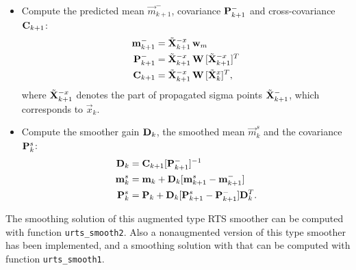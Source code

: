 \begin{itemize}
\item Compute the predicted mean $\vec{m}^-_{k+1}$, covariance
$\mathbf{P}^-_{k+1}$ and cross-covariance $\mathbf{C}_{k+1}$:
\begin{equation}
\begin{split} \mathbf{m}^-_{k+1} &= \tilde{\mathbf{X}}_{k+1}^{-x} \,
\mathbf{w}_m \\ \mathbf{P}^-_{k+1} &= \tilde{\mathbf{X}}_{k+1}^{-x} \, \mathbf{W}
\, [\tilde{\mathbf{X}}_{k+1}^{-x}]^T \\ \mathbf{C}_{k+1} &=
\tilde{\mathbf{X}}_{k+1}^{-x} \, \mathbf{W} \, [\tilde{\mathbf{X}}^x_{k}]^T,
\end{split}
\label{eq:urts4}
\end{equation}
%
where $\tilde{\mathbf{X}}_{k+1}^{-x}$ denotes the part of propagated
sigma points $\tilde{\mathbf{X}}_{k+1}^-$, which corresponds to
$\vec{x}_k$.
%
\item Compute the smoother gain $\mathbf{D}_k$, the smoothed mean
$\vec{m}_k^s$ and the covariance $\mathbf{P}_k^s$:
\begin{equation}
\begin{split} \mathbf{D}_k & = \mathbf{C}_{k+1} [\mathbf{P}_{k+1}^-]^{-1} \\
\mathbf{m}_k^s & = \mathbf{m}_k + \mathbf{D}_k [\mathbf{m}^s_{k+1} -
\mathbf{m}_{k+1}^-] \\ \mathbf{P}_k^s & = \mathbf{P}_k + \mathbf{D}_k
[\mathbf{P}^s_{k+1} - \mathbf{P}_{k+1}^-] \mathbf{D}_k^T.
\end{split}
\label{eq:urts5}
\end{equation}

\end{itemize}
%

The smoothing solution of this augmented type RTS smoother can be
computed with function \texttt{urts\_smooth2}. Also a nonaugmented
version of this type smoother has been implemented, and a smoothing
solution with that can be computed with function
\texttt{urts\_smooth1}.



\newpage \clearpage

%
%
%    
%




%
